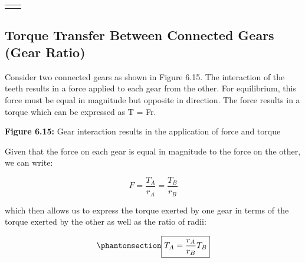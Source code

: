 \documentclass[
  letterpaper,
  DIV=11,
  numbers=noendperiod]{scrreprt}
\theoremstyle{definition}
\theoremstyle{remark}
\begin{document}
\begin{longtable}[]{@{}
  >{\raggedright\arraybackslash}p{}
  >{\raggedright\arraybackslash}p{}@{}}
                                                                                                                                                                                                                                                                                                                                                                                                                                                                                                                                                                                                                                                                                                                                                                                                                                                                                                                                                                                                                                                                                                                                                                                    \) \\
\end{longtable}

\subsection{Torque Transfer Between Connected Gears (Gear
Ratio)}\label{torque-transfer-between-connected-gears-gear-ratio}

Consider two connected gears as shown in Figure 6.15. The interaction of
the teeth results in a force applied to each gear from the other. For
equilibrium, this force must be equal in magnitude but opposite in
direction. The force results in a torque which can be expressed as T =
Fr.

\textbf{Figure 6.15:} Gear interaction results in the application of
force and torque

Given that the force on each gear is equal in magnitude to the force on
the other, we can write:

\[
F=\frac{T_A}{r_A}=\frac{T_B}{r_B}
\]

which then allows us to express the torque exerted by one gear in terms
of the torque exerted by the other as well as the ratio of radii:

\begin{equation}\phantomsection\label{eq-6.5}{
\boxed{T_A=\frac{r_A}{r_B} T_B}
}\end{equation}
\end{document}
